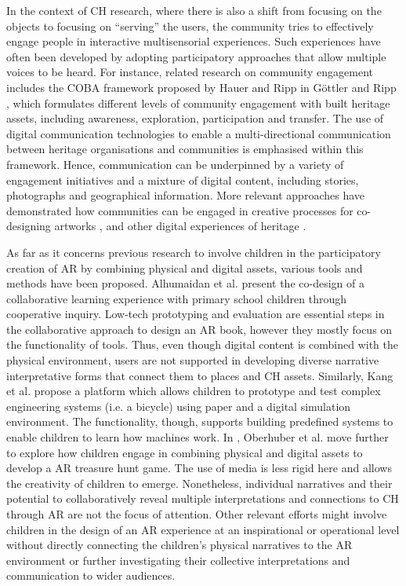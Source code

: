 \documentclass[acmlarge,screen,dvipsnames]{acmart}
\begin{document}
In the context of CH research, where there is also a shift from focusing on the objects to focusing on ``serving'' the users, the community tries to effectively engage people in interactive multisensorial experiences. Such experiences have often been developed by adopting participatory approaches that allow multiple voices to be heard. For instance, related research on community engagement includes the COBA framework proposed by Hauer and Ripp in G{\"o}ttler and Ripp
\cite{icomos1812}, which formulates different levels of community engagement
with built heritage assets, including awareness, exploration, participation
and transfer. The use of digital communication technologies to
enable a multi-directional communication between heritage organisations and
communities is emphasised within this framework. Hence, communication can be underpinned by a variety of engagement initiatives and a mixture of digital content, including stories, photographs and geographical information. More relevant approaches have demonstrated how
communities can be engaged in creative processes for co-designing artworks
\cite{656aab9e240d4479bf2872665a590233}, and other digital experiences of
heritage \cite{ Avram:2019:CGL:3358680.3348793, Fox:2014:CHS:2598510.2598563,
Albouys-Perrois:2018:TMA:3173574.3174203}. 


As far as it concerns previous research to involve children in the participatory creation of AR by combining physical and digital assets, various tools and methods have been proposed. Alhumaidan et al. \cite{ALHUMAIDAN201824} present the co-design of a collaborative learning experience with primary school children through cooperative inquiry. Low-tech prototyping and evaluation are essential steps in the collaborative approach to design an AR book, however they mostly focus on the functionality of tools. Thus, even though digital content is combined with the physical environment, users are not supported in developing diverse narrative interpretative forms that connect them to places and CH assets. Similarly, Kang et al. \cite{10.1145/3173225.3173264} propose a platform which allows children to prototype and test complex engineering systems (i.e. a bicycle) using paper and a digital simulation environment. The functionality, though, supports building predefined systems to enable children to learn how machines work. In \cite{Oberhuber2017}, Oberhuber et al. move further to explore how children engage in combining physical and digital assets to develop a AR treasure hunt game. The use of media is less rigid here and allows the creativity of children to emerge. Nonetheless, individual narratives and their potential to collaboratively reveal multiple interpretations and connections to CH through AR are not the focus of attention. Other relevant efforts \cite{Tobar-Munoz2016,Schofield2019,Santos2014} might involve children in the design of an AR experience at an inspirational or operational level without directly connecting the children's physical narratives to the AR environment or further investigating their collective interpretations and communication to wider audiences. 
\end{document}
